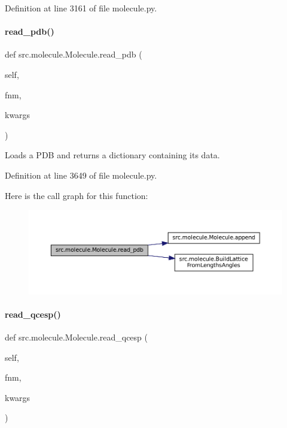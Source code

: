 Definition at line 3161 of file molecule.\+py.

\mbox{\label{classsrc_1_1molecule_1_1Molecule_af52f2ee9f9376925eab6e3309536e011}} 
\paragraph{\texorpdfstring{read\+\_\+pdb()}{read\_pdb()}}
{\footnotesize\ttfamily def src.\+molecule.\+Molecule.\+read\+\_\+pdb (\begin{DoxyParamCaption}\item[{}]{self,  }\item[{}]{fnm,  }\item[{}]{kwargs }\end{DoxyParamCaption})}



Loads a P\+DB and returns a dictionary containing its data. 



Definition at line 3649 of file molecule.\+py.

Here is the call graph for this function\+:
\nopagebreak
\begin{figure}[H]
\begin{center}
\leavevmode
\includegraphics[width=350pt]{classsrc_1_1molecule_1_1Molecule_af52f2ee9f9376925eab6e3309536e011_cgraph}
\end{center}
\end{figure}
\mbox{\label{classsrc_1_1molecule_1_1Molecule_a12369eb306cb29148e610e9ee08d7e2c}} 
\paragraph{\texorpdfstring{read\+\_\+qcesp()}{read\_qcesp()}}
{\footnotesize\ttfamily def src.\+molecule.\+Molecule.\+read\+\_\+qcesp (\begin{DoxyParamCaption}\item[{}]{self,  }\item[{}]{fnm,  }\item[{}]{kwargs }\end{DoxyParamCaption})}



